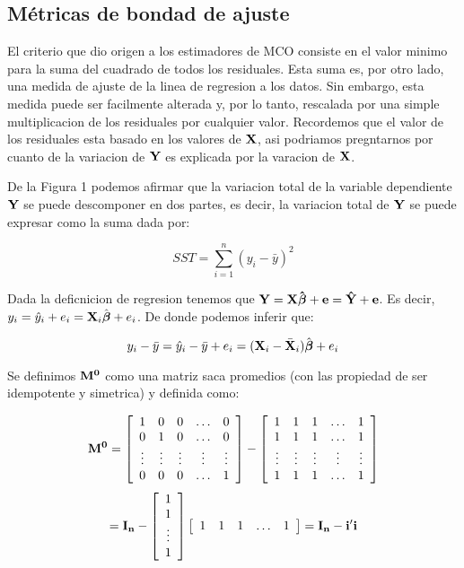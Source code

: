 \documentclass[
  a4paper,
]{article}
\begin{document}
\hypertarget{muxe9tricas-de-bondad-de-ajuste}{%
\subsection{Métricas de bondad de
ajuste}\label{muxe9tricas-de-bondad-de-ajuste}}

El criterio que dio origen a los estimadores de MCO consiste en el valor
m\textquotesingle inimo para la suma del cuadrado de todos los
residuales. Esta suma es, por otro lado, una medida de ajuste de la
l\textquotesingle inea de regresi\textquotesingle on a los datos. Sin
embargo, esta medida puede ser facilmente alterada y, por lo tanto,
rescalada por una simple multiplicaci\textquotesingle on de los
residuales por cualquier valor. Recordemos que el valor de los
residuales esta basado en los valores de \(\bf{X}\),
as\textquotesingle i podr\textquotesingle iamos pregntarnos por cuanto
de la variaci\textquotesingle on de \(\bf{Y}\) es explicada por la
varaci\textquotesingle on de \(\bf{X}\).

De la Figura 1 podemos afirmar que la variaci\textquotesingle on total
de la variable dependiente \(\bf{Y}\) se puede descomponer en dos
partes, es decir, la variaci\textquotesingle on total de \(\bf{Y}\) se
puede expresar como la suma dada por:

\[SST = \sum^{n}_{i=1}{(y_i - \bar{y})^2} \]

Dada la deficnici\textquotesingle on de regresi\textquotesingle on
tenemos que
\(\bf{Y} = \bf{X} \hat{\boldsymbol{\beta}} + \bf{e} = \hat{\bf{Y}} + \bf{e}\).
Es decir,
\(y_i = \hat{y}_i + e_i = {\bf{X}}_i \hat{\boldsymbol{\beta}} + e_i\).
De donde podemos inferir que:

\[ y_i - \bar{y} = \hat{y}_i - \bar{y} + e_i = ({\bf{X}}_i - \bar{\bf{X}}_i )\hat{\boldsymbol{\beta}} + e_i \]

Se definimos \(\bf{M^0}\) como una matriz saca promedios (con las
propiedad de ser idempotente y simetrica) y definida como:

\[
\bf{M^0}= 
\left[ \begin{array}{ccccc}
1 & 0 & 0 & \ldots & 0 \\
0 & 1 & 0 & \ldots & 0 \\
\vdots & \vdots & \vdots & \vdots & \vdots \\
0 & 0 & 0 & \ldots & 1
\end{array} \right] 
-
\left[ \begin{array}{ccccc}
1 & 1 & 1 & \ldots & 1 \\
1 & 1 & 1 & \ldots & 1 \\
\vdots & \vdots & \vdots & \vdots & \vdots \\
1 & 1 & 1 & \ldots & 1
\end{array} \right] 
\] \[=
\bf{I}_n 
-
\left[ \begin{array}{c}
1  \\
1 \\
\vdots \\
1 
\end{array} \right]  
\left[ \begin{array}{ccccc}
1 & 1 & 1 & \ldots & 1 \\
\end{array} \right] 
=
\bf{I}_n - i'i
\]
\end{document}
